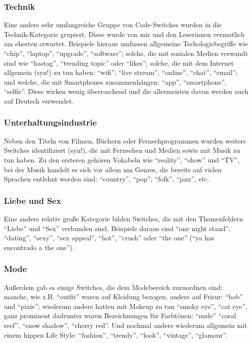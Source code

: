 \subsubsection{Technik}
Eine andere sehr umfangreiche Gruppe von Code-Switches wurden in die Technik-Kategorie grupiert.
Diese wurde von mir und den Leserinnen vermutlich am ehesten erwartet.
Beispiele hieraus umfassen allgemeine Techologiebegriffe wie ``chip'', ``laptop'', ``upgrade'', ``software'';
solche, die mit sozialen Medien verwandt sind wie ``hastag'', ``trending topic'' oder ``likes'';
solche, die mit dem Internet allgemein (syn!) zu tun haben: ``wifi'', ``live stream'', ``online'', ``chat'', ``email'';
und welche, die mit Smartphones zusammenhängen: ``app'', ``smartphone'', ``selfie''.
Diese wirken wenig überraschend und die allermeisten davon werden auch auf Deutsch verwendet.


\subsubsection{Unterhaltungsindustrie}
Neben den Titeln von Filmen, Büchern oder Fernsehprogrammen wurden weitere Switches identifiziert (syn!), die mit Fernsehen und Medien sowie mit Musik zu tun haben.
Zu den ersteren gehören Vokabeln wie ``reality'', ``show'' und ``TV'',
bei der Musik handelt es sich vor allem um Genres, die bereits auf vielen Sprachen entlehnt worden sind: ``country'', ``pop'', ``folk'', ``jazz'', etc.

\subsubsection{Liebe und Sex}
Eine andere relativ große Kategorie bilden Switches, die mit den Themenfeldern ``Liebe'' und ``Sex'' verbunden sind.
Beispiele daraus sind ``one night stand'', ``dating'', ``sexy'', ``sex appeal'', ``hot'', ``crush'' oder ``the one'' (``ya has encontrado a the one'').

\subsubsection{Mode}
Außerdem gab es einige Switches, die dem Modebereich zuzuordnen sind:
manche, wie z.B. ``outfit'' waren auf Kleidung bezogen, andere auf Frisur: ``bob'' und ``pixie'';
wiederum andere hatten mit Makeup zu tun ``smoky eye'', ``cat eye'', ganz prominent dadrunter waren Bezeichnungen für Farbtönen: ``nude'' ``coral reef'', ``snow shadow'', ``cherry red''.
Und nochmal andere wiederum allgemein mit einem hippen Life Style:
``fashion'', ``trendy'', ``look'', ``vintage'', ``glamour''.

